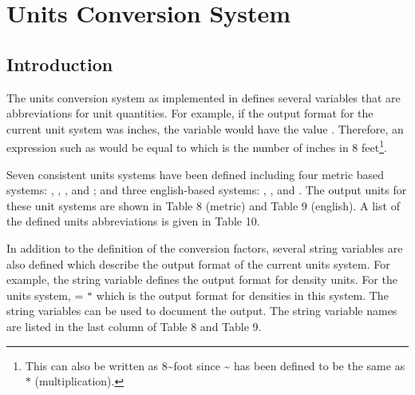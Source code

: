 \chapter{Units Conversion System}\label{ch:units}

\section{Introduction}

The units conversion system as implemented in \aprepro{} defines
several variables that are abbreviations for unit quantities. For
example, if the output format for the current unit system was inches,
the variable  would have the value . Therefore, an
expression such as  would be equal to  which is the
number of inches in 8 feet\footnote{This can also be written as 8\~{}foot since \~{} has been defined to be the same as $*$ (multiplication).}.

Seven consistent units systems have been defined including four metric
based systems: , , , and ; and
three english-based systems: , , and
. The output units for these unit systems are shown in
Table 8 (metric) and Table 9 (english). A list of the defined units
abbreviations is given in Table 10.

In addition to the definition of the conversion factors, several
string variables are also defined which describe the output format of
the current units system.  For example, the string variable 
defines the output format for density units. For the 
units system,  =
\texttt{"}
which is the output format for densities in this system. The string
variables can be used to document the \aprepro{} output. The
string variable names are listed in the last column of Table 8 and Table 9.

